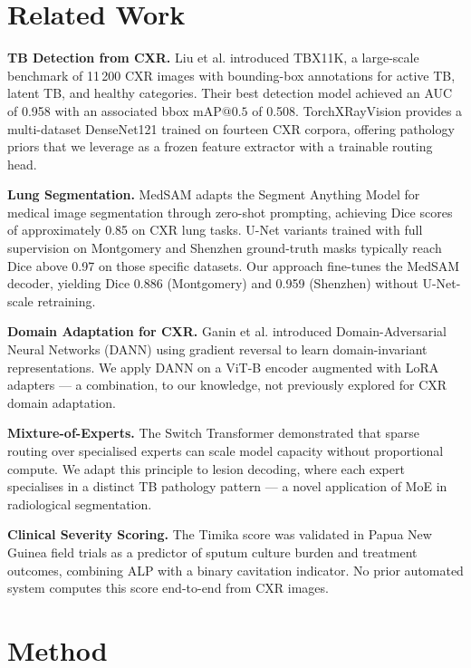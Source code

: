 \documentclass{article}
\begin{document}
\section{Related Work}

\textbf{TB Detection from CXR.} Liu et al. \cite{liu2020tbx11k} introduced TBX11K, a large-scale benchmark of 11\,200 CXR images with bounding-box annotations for active TB, latent TB, and healthy categories. Their best detection model achieved an AUC of 0.958 with an associated bbox $\text{mAP}@0.5$ of 0.508. TorchXRayVision \cite{cohen2022torchxrayvision} provides a multi-dataset DenseNet121 \cite{huang2017densenet} trained on fourteen CXR corpora, offering pathology priors that we leverage as a frozen feature extractor with a trainable routing head.

\textbf{Lung Segmentation.} MedSAM \cite{ma2024medsam} adapts the Segment Anything Model \cite{kirillov2023sam} for medical image segmentation through zero-shot prompting, achieving Dice scores of approximately 0.85 on CXR lung tasks. U-Net variants \cite{ronneberger2015unet} trained with full supervision on Montgomery and Shenzhen ground-truth masks typically reach Dice above 0.97 on those specific datasets. Our approach fine-tunes the MedSAM decoder, yielding Dice 0.886 (Montgomery) and 0.959 (Shenzhen) without U-Net-scale retraining.

\textbf{Domain Adaptation for CXR.} Ganin et al. \cite{ganin2016domain} introduced Domain-Adversarial Neural Networks (DANN) using gradient reversal to learn domain-invariant representations. We apply DANN on a ViT-B encoder \cite{dosovitskiy2021vit} augmented with LoRA adapters \cite{hu2022lora} --- a combination, to our knowledge, not previously explored for CXR domain adaptation.

\textbf{Mixture-of-Experts.} The Switch Transformer \cite{fedorov2017switch} demonstrated that sparse routing over specialised experts can scale model capacity without proportional compute. We adapt this principle to lesion decoding, where each expert specialises in a distinct TB pathology pattern --- a novel application of MoE in radiological segmentation.

\textbf{Clinical Severity Scoring.} The Timika score \cite{ralph2013timika} was validated in Papua New Guinea field trials as a predictor of sputum culture burden and treatment outcomes, combining ALP with a binary cavitation indicator. No prior automated system computes this score end-to-end from CXR images.

\section{Method}
\end{document}
